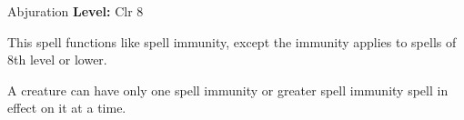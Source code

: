 {Abjuration}
{
	\textbf{Level:}
	Clr 8\\
}
{
	This spell functions like spell immunity, except the immunity applies to spells of 8th level or lower.

	A creature can have only one spell immunity or greater spell immunity spell in effect on it at a time.

}
